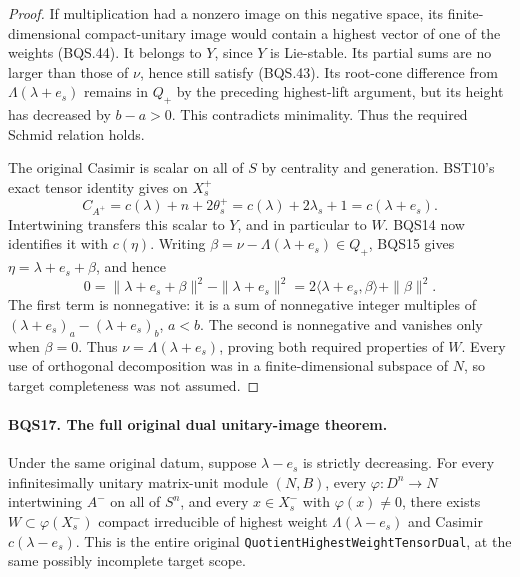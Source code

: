 \documentclass[11pt,a4paper]{article}
\numberwithin{equation}{section}
\theoremstyle{remark}\newtheorem{remark}[theorem]{Remark}
\begin{document}
\begin{proof}
If multiplication had a nonzero image on this negative space, its
finite-dimensional compact-unitary image would contain a highest
vector of one of the weights (BQS.44).
It belongs to $Y$, since $Y$ is Lie-stable.
Its partial sums are no larger than those of $\nu$, hence still
satisfy (BQS.43).  Its root-cone difference from
$\Lambda(\lambda+e_s)$ remains in $Q_+$ by the preceding highest-lift
argument, but its height has decreased by $b-a>0$.
This contradicts minimality.  Thus the required Schmid relation holds.

The original Casimir is scalar on all of $S$ by centrality and generation.
BST10's exact tensor identity gives on $X_s^+$
\[
 C_{A^+}=c(\lambda)+n+2\theta_s^+
         =c(\lambda)+2\lambda_s+1=c(\lambda+e_s).
 \tag{BQS.45}
\]
Intertwining transfers this scalar to $Y$, and in particular to $W$.
BQS14 now identifies it with $c(\eta)$.
Writing $\beta=\nu-\Lambda(\lambda+e_s)\in Q_+$, BQS15 gives
$\eta=\lambda+e_s+\beta$, and hence
\[
 0=\|\lambda+e_s+\beta\|^2-\|\lambda+e_s\|^2
   =2\langle\lambda+e_s,\beta\rangle+\|\beta\|^2.
 \tag{BQS.46}
\]
The first term is nonnegative: it is a sum of nonnegative integer
multiples of $(\lambda+e_s)_a-(\lambda+e_s)_b$, $a<b$.
The second is nonnegative and vanishes only when $\beta=0$.
Thus $\nu=\Lambda(\lambda+e_s)$, proving both required properties
of $W$.  Every use of orthogonal decomposition was in a finite-dimensional
subspace of $N$, so target completeness was not assumed.
\end{proof}

\paragraph{BQS17. The full original dual unitary-image theorem.}
\label{claim:BQS17}
Under the same original datum, suppose $\lambda-e_s$ is strictly
decreasing.  For every infinitesimally unitary matrix-unit module
$(N,B)$, every $\varphi:D^n\to N$ intertwining $A^-$ on all of $S^n$,
and every $x\in X_s^-$ with $\varphi(x)\ne0$, there exists
$W\subset\varphi(X_s^-)$ compact irreducible of highest weight
$\Lambda(\lambda-e_s)$ and Casimir $c(\lambda-e_s)$.
This is the entire original \texttt{Quotient\allowbreak Highest\allowbreak Weight\allowbreak Tensor\allowbreak Dual},
at the same possibly incomplete target scope.
\end{document}
